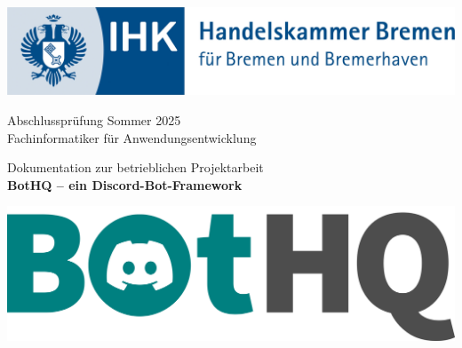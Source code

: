 
\hypersetup{pageanchor=false}
\begin{titlepage}
    \begin{center}
        \includegraphics[width=.5\textwidth]{images/handelskammer-logo-alt.jpg}

        \vspace{1cm}
        \large
        Abschlussprüfung Sommer 2025\\
        Fachinformatiker für Anwendungsentwicklung\\

        \vspace{2cm}

        \Large Dokumentation zur betrieblichen Projektarbeit\\
        \LARGE
        \textbf{BotHQ – ein Discord-Bot-Framework}
                    
        \vspace{2em}
        \includegraphics[width=.62\textwidth]{images/bothq-logo.png}
        
        
            

\end{center}
\end{titlepage}
